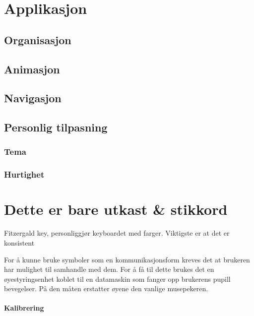 \documentclass[phd,tocprelim]{cornell}
\begin{document}
\chapter{Applikasjon}

\section{Organisasjon}


\section{Animasjon}

\section{Navigasjon}

\section{Personlig tilpasning}

\subsection{Tema}

\subsection{Hurtighet}









\chapter{Dette er bare utkast & stikkord}

Fitzergald key, personliggjør keyboardet med farger. Viktigste er at det er konsistent


For å kunne bruke symboler som en kommunikasjonsform kreves det at brukeren har mulighet til samhandle med dem. For å få til dette brukes det en øyestyringsenhet koblet til en datamaskin som fanger opp brukerens pupill bevegelser. På den måten erstatter øyene den vanlige musepekeren.

\subsubsection{Kalibrering}
\end{document}
